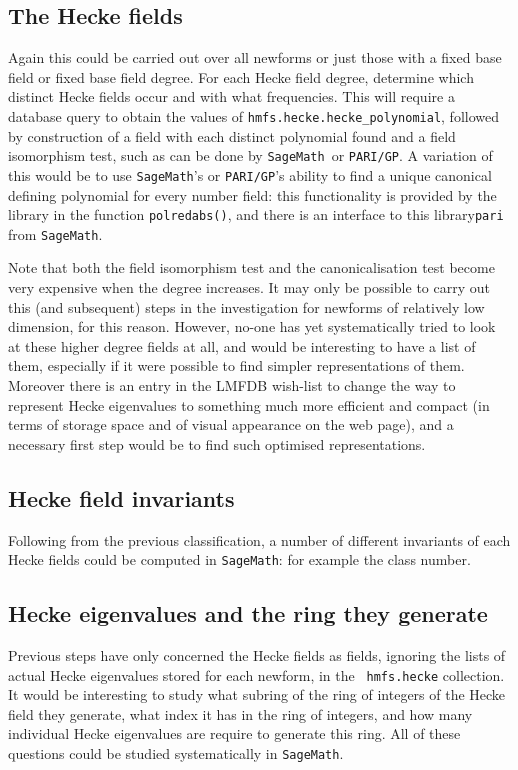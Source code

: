 \documentclass{llncs}
\def\Sage{{\tt SageMath}}
\def\Pari{{\tt PARI/GP}}
\begin{document}
\subsection{The Hecke fields} Again this could be carried out over all
newforms or just those with a fixed base field or fixed base field
degree.  For each Hecke field degree, determine which distinct Hecke
fields occur and with what frequencies.  This will require a database
query to obtain the values of {\tt hmfs.hecke.hecke\_polynomial},
followed by construction of a field with each distinct polynomial
found and a field isomorphism test, such as can be done by \Sage\ or
\Pari.  A variation of this would be to use \Sage's or \Pari's ability
to find a unique canonical defining polynomial for every number field:
this functionality is provided by the  library in the
function {\tt polredabs()}, and there is an interface to this
library{\tt pari} from \Sage.

Note that both the field isomorphism test and the canonicalisation
test become very expensive when the degree increases.  It may only be
possible to carry out this (and subsequent) steps in the investigation
for newforms of relatively low dimension, for this reason.  However,
no-one has yet systematically tried to look at these higher degree
fields at all, and would be interesting to have a list of them,
especially if it were possible to find simpler representations of
them.  Moreover there is an entry in the LMFDB wish-list to change the
way to represent Hecke eigenvalues to something much more efficient
and compact (in terms of storage space and of visual appearance on the
web page), and a necessary first step would be to find such optimised
representations.

\subsection{Hecke field invariants} Following from the previous
classification, a number of different invariants of each Hecke fields
could be computed in \Sage: for example the class number.

\subsection{Hecke eigenvalues and the ring they generate} Previous
steps have only concerned the Hecke fields as fields, ignoring the
lists of actual Hecke eigenvalues stored for each newform, in the {\tt
  hmfs.hecke} collection.  It would be interesting to study what
subring of the ring of integers of the Hecke field they generate, what
index it has in the ring of integers, and how many individual Hecke
eigenvalues are require to generate this ring.  All of these questions
could be studied systematically in \Sage.
\end{document}
